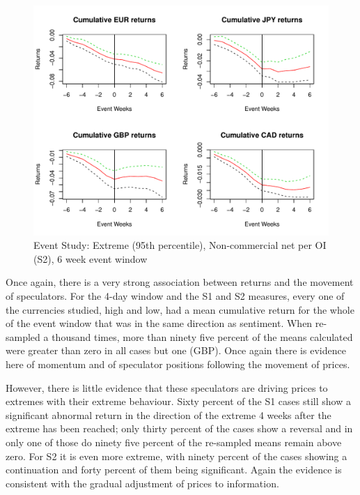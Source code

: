 \documentclass[12pt, a4paper, oneside]{article} %
\begin{document}
\begin{figure}[h!]
\graphicspath{{../Figures/}}
\centering
\caption{Event Study:  Extreme (95th percentile), Non-commercial net per OI (S2), 6 week event window}
\label{fig:ES3}
\includegraphics[scale=0.8]{FPCum6w}
\end{figure}

Once again, there is a very strong association between returns and the movement of speculators.  For the 4-day window and the S1 and S2 measures, every one of the currencies studied, high and low, had a mean cumulative return for the whole of the event window that was in the same direction as sentiment.  When re-sampled a thousand times, more than ninety five percent of the means calculated were greater than zero in all cases but one (GBP).  Once again there is evidence here of momentum and of speculator positions following the movement of prices.    

However, there is little evidence that these speculators are driving prices to extremes with their extreme behaviour.  Sixty percent of the S1 cases still show a significant abnormal return in the direction of the extreme 4 weeks after the extreme has been reached; only thirty percent of the cases show a reversal and in only one of those do ninety five percent of the re-sampled means remain above zero.  For S2 it is even more extreme, with ninety percent of the cases showing a continuation and forty percent of them being significant.  Again the evidence is consistent with the gradual adjustment of prices to information. 
\end{document}

